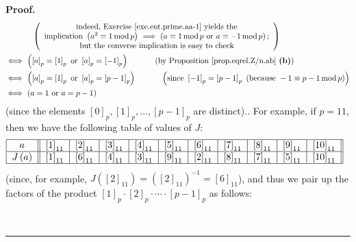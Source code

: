 \documentclass[numbers=enddot,12pt,final,onecolumn,notitlepage]{scrartcl}%
\numberwithin{exer}{subsection}
\theoremstyle{definition}
\newenvironment{proof}[1][Proof]{\noindent\textbf{#1.} }{\ \rule{0.5em}{0.5em}}
\begin{document}
\begin{proof}
{\begin{align*}
&  \ \ \ \ \ \ \ \ \ \ \left(
\begin{array}
[c]{c}%
\text{indeed, Exercise \ref{exe.ent.prime.aa-1} yields the}\\
\text{implication }\left(  a^{2}\equiv1\operatorname{mod}p\right)
\ \Longrightarrow\ \left(  a\equiv1\operatorname{mod}p\text{ or }%
a\equiv-1\operatorname{mod}p\right)  \text{;}\\
\text{but the converse implication is easy to check}%
\end{array}
\right) \\
&  \Longleftrightarrow\ \left(  \left[  a\right]  _{p}=\left[  1\right]
_{p}\text{ or }\left[  a\right]  _{p}=\left[  -1\right]  _{p}\right)
\ \ \ \ \ \ \ \ \ \ \left(  \text{by Proposition \ref{prop.eqrel.Z/n.ab}
\textbf{(b)}}\right) \\
&  \Longleftrightarrow\ \left(  \left[  a\right]  _{p}=\left[  1\right]
_{p}\text{ or }\left[  a\right]  _{p}=\left[  p-1\right]  _{p}\right)
\ \ \ \ \ \ \ \ \ \ \left(  \text{since }\left[  -1\right]  _{p}=\left[
p-1\right]  _{p}\text{ (because }-1\equiv p-1\operatorname{mod}p\text{)}%
\right) \\
&  \Longleftrightarrow\ \left(  a=1\text{ or }a=p-1\right)
\end{align*}
(since the elements $\left[  0\right]  _{p},\left[  1\right]  _{p}%
,\ldots,\left[  p-1\right]  _{p}$ are distinct).}. For example, if $p=11$,
then we have the following table of values of $J$:%
\[%
\begin{tabular}
[c]{|c||c|c|c|c|c|c|c|c|c|c||}\hline
$a$ & $\left[  1\right]  _{11}$ & $\left[  2\right]  _{11}$ & $\left[
3\right]  _{11}$ & $\left[  4\right]  _{11}$ & $\left[  5\right]  _{11}$ &
$\left[  6\right]  _{11}$ & $\left[  7\right]  _{11}$ & $\left[  8\right]
_{11}$ & $\left[  9\right]  _{11}$ & $\left[  10\right]  _{11}$\\\hline
$J\left(  a\right)  $ & $\left[  1\right]  _{11}$ & $\left[  6\right]  _{11}$
& $\left[  4\right]  _{11}$ & $\left[  3\right]  _{11}$ & $\left[  9\right]
_{11}$ & $\left[  2\right]  _{11}$ & $\left[  8\right]  _{11}$ & $\left[
7\right]  _{11}$ & $\left[  5\right]  _{11}$ & $\left[  10\right]  _{11}%
$\\\hline
\end{tabular}
\ \
\]
(since, for example, $J\left(  \left[  2\right]  _{11}\right)  =\left(
\left[  2\right]  _{11}\right)  ^{-1}=\left[  6\right]  _{11}$), and thus we
pair up the factors of the product $\left[  1\right]  _{p}\cdot\left[
2\right]  _{p}\cdot\cdots\cdot\left[  p-1\right]  _{p}$ as follows:%

\end{proof}
\end{document}
